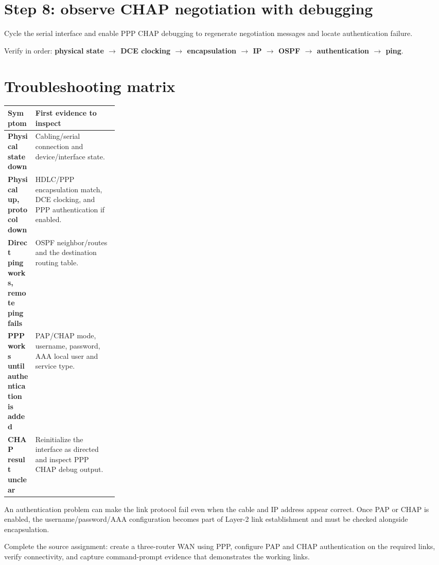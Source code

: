 \section{Step 8: observe CHAP negotiation with debugging}
Cycle the serial interface and enable PPP CHAP debugging to regenerate negotiation messages and locate authentication failure.


\begin{verifybox}
Verify in order: \textbf{physical state $\rightarrow$ DCE clocking $\rightarrow$ encapsulation $\rightarrow$ IP $\rightarrow$ OSPF $\rightarrow$ authentication $\rightarrow$ ping}.
\end{verifybox}

\section{Troubleshooting matrix}
\begin{tabularx}{\linewidth}{>{\bfseries}p{0.25\linewidth}X}
\toprule
Symptom & First evidence to inspect\\\midrule
Physical state down & Cabling/serial connection and device/interface state.\\
Physical up, protocol down & HDLC/PPP encapsulation match, DCE clocking, and PPP authentication if enabled.\\
Direct ping works, remote ping fails & OSPF neighbor/routes and the destination routing table.\\
PPP works until authentication is added & PAP/CHAP mode, username, password, AAA local user and service type.\\
CHAP result unclear & Reinitialize the interface as directed and inspect PPP CHAP debug output.\\\bottomrule
\end{tabularx}

\begin{pitfall}
An authentication problem can make the link protocol fail even when the cable and IP address appear correct. Once PAP or CHAP is enabled, the username/password/AAA configuration becomes part of Layer-2 link establishment and must be checked alongside encapsulation.
\end{pitfall}

\begin{tryit}
Complete the source assignment: create a three-router WAN using PPP, configure PAP and CHAP authentication on the required links, verify connectivity, and capture command-prompt evidence that demonstrates the working links.
\end{tryit}

